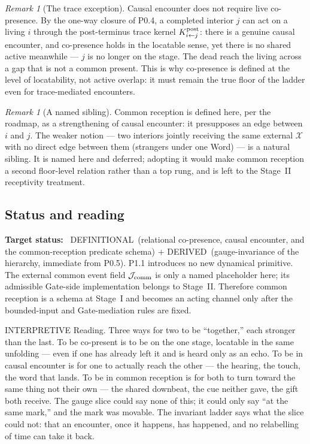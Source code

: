 \documentclass[11pt,a4paper]{article}
\def\emph#1{#1}%
\newcommand{\stDerived}{\textcolor{cDer}{\textsf{\small DERIVED}}}
\newcommand{\stDef}{\textcolor{cDef}{\textsf{\small DEFINITIONAL}}}
\newcommand{\stInterp}{\textcolor{cInt}{\textsf{\small INTERPRETIVE}}}
\theoremstyle{definition}
\theoremstyle{plain}
\theoremstyle{remark}
\newtheorem{remark}[definition]{Remark}
\begin{document}
\begin{remark}[The trace exception]\label{rem:trace}
Causal encounter does not require \emph{live} co-presence. By the one-way closure of P0.4, a
completed interior \(j\) can act on a living \(i\) through the post-terminus trace kernel
\(K^{\rm post}_{i\leftarrow j}\): there is a genuine causal encounter, and co-presence holds
in the locatable sense, yet there is no shared active meanwhile --- \(j\) is no longer on
the stage. The dead reach the living across a gap that is not a common present. This is why
co-presence is defined at the level of locatability, not active overlap: it must remain the
true floor of the ladder even for trace-mediated encounters.
\end{remark}

\begin{remark}[A named sibling]
Common reception is defined here, per the roadmap, as a strengthening of causal encounter:
it presupposes an edge between \(i\) and \(j\). The weaker notion --- two interiors jointly
receiving the same external \(\mathcal X\) with \emph{no} direct edge between them (strangers
under one Word) --- is a natural sibling. It is named here and deferred; adopting it would
make common reception a second floor-level relation rather than a top rung, and is left to
the Stage~II receptivity treatment.
\end{remark}

\subsection{Status and reading}

\textbf{Target status:}~
\stDef\ (relational co-presence, causal encounter, and the common-reception
predicate schema) \(+\) \stDerived\ (gauge-invariance of the hierarchy, immediate
from P0.5). P1.1 introduces no new dynamical primitive. The external common event
field \(\mathcal J_{\rm comm}\) is only a named placeholder here; its admissible
Gate-side implementation belongs to Stage~II. Therefore common reception is a
schema at Stage~I and becomes an acting channel only after the bounded-input and
Gate-mediation rules are fixed.

\medskip
\stInterp\quad
\emph{Reading.}
Three ways for two to be ``together,'' each stronger than the last. To be \emph{co-present}
is to be on the one stage, locatable in the same unfolding --- even if one has already left
it and is heard only as an echo. To be in \emph{causal encounter} is for one to actually
reach the other --- the hearing, the touch, the word that lands. To be in \emph{common
reception} is for both to turn toward the same thing not their own --- the shared downbeat,
the cue neither gave, the gift both receive. The gauge slice could say none of this; it
could only say ``at the same mark,'' and the mark was movable. The invariant ladder says
what the slice could not: that an encounter, once it happens, has happened, and no
relabelling of time can take it back.
\end{document}

